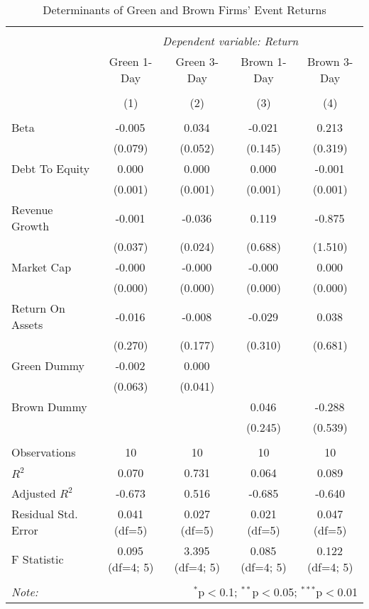 \begin{table}[!htbp] \centering
  \caption{Determinants of Green and Brown Firms' Event Returns}
\begin{tabular}{@{\extracolsep{5pt}}lcccc}
\\[-1.8ex]\hline
\hline \\[-1.8ex]
& \multicolumn{4}{c}{\textit{Dependent variable: Return}} \
\cr \cline{2-5}
\\[-1.8ex] & \multicolumn{1}{c}{Green 1-Day} & \multicolumn{1}{c}{Green 3-Day} & \multicolumn{1}{c}{Brown 1-Day} & \multicolumn{1}{c}{Brown 3-Day}  \\
\\[-1.8ex] & (1) & (2) & (3) & (4) \\
\hline \\[-1.8ex]
 Beta & -0.005$^{}$ & 0.034$^{}$ & -0.021$^{}$ & 0.213$^{}$ \\
& (0.079) & (0.052) & (0.145) & (0.319) \\
 Debt To Equity & 0.000$^{}$ & 0.000$^{}$ & 0.000$^{}$ & -0.001$^{}$ \\
& (0.001) & (0.001) & (0.001) & (0.001) \\
 Revenue Growth & -0.001$^{}$ & -0.036$^{}$ & 0.119$^{}$ & -0.875$^{}$ \\
& (0.037) & (0.024) & (0.688) & (1.510) \\
 Market Cap & -0.000$^{}$ & -0.000$^{}$ & -0.000$^{}$ & 0.000$^{}$ \\
& (0.000) & (0.000) & (0.000) & (0.000) \\
 Return On Assets & -0.016$^{}$ & -0.008$^{}$ & -0.029$^{}$ & 0.038$^{}$ \\
& (0.270) & (0.177) & (0.310) & (0.681) \\
 Green Dummy & -0.002$^{}$ & 0.000$^{}$ & & \\
& (0.063) & (0.041) & & \\
 Brown Dummy & & & 0.046$^{}$ & -0.288$^{}$ \\
& & & (0.245) & (0.539) \\
\hline \\[-1.8ex]
 Observations & 10 & 10 & 10 & 10 \\
 $R^2$ & 0.070 & 0.731 & 0.064 & 0.089 \\
 Adjusted $R^2$ & -0.673 & 0.516 & -0.685 & -0.640 \\
 Residual Std. Error & 0.041 (df=5) & 0.027 (df=5) & 0.021 (df=5) & 0.047 (df=5) \\
 F Statistic & 0.095$^{}$ (df=4; 5) & 3.395$^{}$ (df=4; 5) & 0.085$^{}$ (df=4; 5) & 0.122$^{}$ (df=4; 5) \\
\hline
\hline \\[-1.8ex]
\textit{Note:} & \multicolumn{4}{r}{$^{*}$p$<$0.1; $^{**}$p$<$0.05; $^{***}$p$<$0.01} \\
\end{tabular}
\end{table}